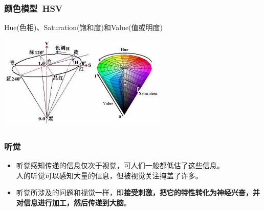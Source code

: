 \documentclass{beamer}
\begin{document}
\begin{frame}
	\frametitle{颜色模型~{\small HSV}}
	Hue(色相)、Saturation(饱和度)和Value(值或明度)
	\begin{center}
		\includegraphics[width=8cm]{images/HSV_ColorModel.jpg}
	\end{center}
\end{frame}

\begin{frame}
	\frametitle{听觉}
	\beamertemplatetransparentcovereddynamicmedium 
	\begin{itemize}[<+->]
		\item 听觉感知传递的信息仅次于视觉，可人们一般都低估了这些信息。\\{\small 人的听觉可以感知大量的信息，但被视觉关注掩盖了许多。}
		\item 听觉所涉及的问题和视觉一样，即\textbf{接受刺激，把它的特性转化为神经兴奋，并对信息进行加工，然后传递到大脑}。
	\end{itemize}
\end{frame}

{
\frame[plain]{\transdissolve}
}
\end{document}
